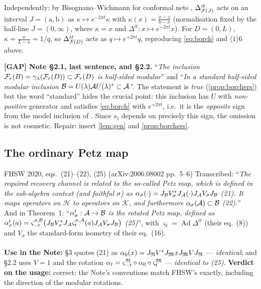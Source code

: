 \documentclass[11pt]{article}
\newcommand{\Ad}{\operatorname{Ad}}
\renewcommand{\cB}{\mathcal B}
\begin{document}
\begin{remark}
Independently: by Bisognano--Wichmann for conformal nets \cite{BGL}, $\Delta_{\mathcal F(J)}^{it}$
acts on an interval $J=(\mathrm a,\mathrm b)$ as $\kappa\mapsto e^{-2\pi t}\kappa$
with $\kappa(x)=\frac{x-\mathrm a}{\mathrm b-x}$ (normalisation fixed by the half-line
$J=(0,\infty)$, where $\kappa=x$ and $\Delta^{it}:x\mapsto e^{-2\pi t}x$). For $D=(0,L)$,
$\kappa=\frac x{L-x}=1/q$, so $\Delta_{\mathcal F(D)}^{it}$ acts as $q\mapsto e^{+2\pi t}q$,
reproducing \eqref{eq:borch} and $\langle1\rangle6$ above.
\end{remark}

\begin{verdictgap}
\textbf{[GAP] Note \S2.1, last sentence, and \S2.2.} ``\emph{The inclusion
$\mathcal F_r(B)=\gamma_\lambda(\mathcal F_r(D))\subset\mathcal F_r(D)$ is half-sided modular}'' and
``\emph{In a standard half-sided modular inclusion
$\cB=U(\lambda)\cA U(\lambda)^*\subset\cA$}''. The statement is \emph{true}
(\cref{prop:borchers}) but the word ``standard'' hides the crucial point: this
inclusion has $U$ with \emph{non-positive} generator and satisfies
\eqref{eq:borch} with $e^{+2\pi t}$, i.e.\ it is the \emph{opposite} sign from
the model inclusion of \cite[\S4.2]{FHSW}. Since $s_t$ depends on precisely
this sign, the omission is not cosmetic. Repair: insert \cref{lem:gen} and
\cref{prop:borchers}.
\end{verdictgap}

\subsection{The ordinary Petz map}

\begin{citedbox}{FHSW 2020, eqs.~(21)--(22), (25) (arXiv:2006.08002 pp.~5--6)}
Transcribed: ``\emph{The required recovery channel is related to the so-called
Petz map, which is defined in the sub-algebra context (and faithful $\sigma$)
as} $\alpha_\sigma(\cdot)=J_\cB V_\sigma^*J_\cA(\cdot)J_\cA V_\sigma J_\cB$
\emph{(21). It maps operators on $\mathscr H$ to operators on $\mathscr K$, and
furthermore} $\alpha_\sigma(\cA)\subset\cB$ \emph{(22).}''\\
And in Theorem~1: ``\emph{$\alpha^t_\sigma:\cA\to\cB$ is the rotated Petz map,
defined as} $\alpha^t_\sigma(a)=\varsigma^{\sigma,\cB}_{-t}\bigl(J_\cB V_\sigma^*J_\cA
\varsigma^{\sigma,\cA}_t(a)J_\cA V_\sigma J_\cB\bigr)$ \emph{(25)}'', with
$\varsigma_t=\Ad\Delta^{it}$ (their eq.~(8)) and $V_\sigma$ the standard-form
isometry of their eq.~(16).\\[2pt]
\\[2pt]
\textbf{Use in the Note:} \S3 quotes (21) as
$\alpha_0(x)=J_\mathfrak N V^*J_\mathfrak M xJ_\mathfrak M VJ_\mathfrak N$ --- \emph{identical}; and \S2.2 uses
$V=1$ and the rotation $\alpha_t=\varsigma^\mathfrak N_{-t}\circ\alpha_0\circ\varsigma^\mathfrak M_t$
--- \emph{identical to (25)}.
\textbf{Verdict on the usage:} correct; the Note's conventions match FHSW's
exactly, including the direction of the modular rotations.
\end{citedbox}
\end{document}
